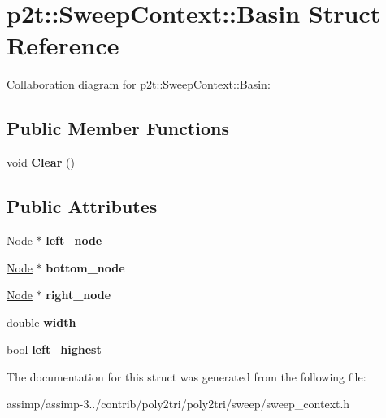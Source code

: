 \hypertarget{structp2t_1_1_sweep_context_1_1_basin}{\section{p2t\+:\+:Sweep\+Context\+:\+:Basin Struct Reference}
\label{structp2t_1_1_sweep_context_1_1_basin}
}


Collaboration diagram for p2t\+:\+:Sweep\+Context\+:\+:Basin\+:
\subsection*{Public Member Functions}
\begin{DoxyCompactItemize}
\item 
\hypertarget{structp2t_1_1_sweep_context_1_1_basin_a212e9df729cb98f0089a4e54da19fc81}{void {\bfseries Clear} ()}\label{structp2t_1_1_sweep_context_1_1_basin_a212e9df729cb98f0089a4e54da19fc81}

\end{DoxyCompactItemize}
\subsection*{Public Attributes}
\begin{DoxyCompactItemize}
\item 
\hypertarget{structp2t_1_1_sweep_context_1_1_basin_ac547533c638f5c459b036087b044cae6}{\hyperlink{structp2t_1_1_node}{Node} $\ast$ {\bfseries left\+\_\+node}}\label{structp2t_1_1_sweep_context_1_1_basin_ac547533c638f5c459b036087b044cae6}

\item 
\hypertarget{structp2t_1_1_sweep_context_1_1_basin_ab5fe6e9f2d3b16b38e9303b9fae1d00f}{\hyperlink{structp2t_1_1_node}{Node} $\ast$ {\bfseries bottom\+\_\+node}}\label{structp2t_1_1_sweep_context_1_1_basin_ab5fe6e9f2d3b16b38e9303b9fae1d00f}

\item 
\hypertarget{structp2t_1_1_sweep_context_1_1_basin_a87f10edada0bf4a6c29cfb369c39bbb2}{\hyperlink{structp2t_1_1_node}{Node} $\ast$ {\bfseries right\+\_\+node}}\label{structp2t_1_1_sweep_context_1_1_basin_a87f10edada0bf4a6c29cfb369c39bbb2}

\item 
\hypertarget{structp2t_1_1_sweep_context_1_1_basin_af3a83853a71d90a5ad0e2db66f44911c}{double {\bfseries width}}\label{structp2t_1_1_sweep_context_1_1_basin_af3a83853a71d90a5ad0e2db66f44911c}

\item 
\hypertarget{structp2t_1_1_sweep_context_1_1_basin_a91a2cdcccb03f88b66ce7e86e3d9820f}{bool {\bfseries left\+\_\+highest}}\label{structp2t_1_1_sweep_context_1_1_basin_a91a2cdcccb03f88b66ce7e86e3d9820f}

\end{DoxyCompactItemize}


The documentation for this struct was generated from the following file\+:\begin{DoxyCompactItemize}
\item 
assimp/assimp-\/3../contrib/poly2tri/poly2tri/sweep/sweep\+\_\+context.\+h\end{DoxyCompactItemize}
